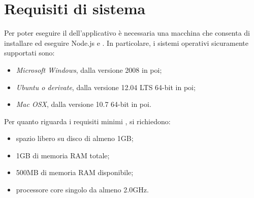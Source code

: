 \section{Requisiti di sistema}\label{requisiti}
Per poter eseguire il  dell'applicativo è necessaria una macchina che consenta di installare ed eseguire Node.js e . In particolare, i sistemi operativi sicuramente supportati sono:
\begin{itemize}
\item \textit{Microsoft Windows}, dalla versione 2008  in poi;
\item \textit{Ubuntu o derivate}, dalla versione 12.04 LTS 64-bit in poi;
\item \textit{Mac OSX}, dalla versione 10.7 64-bit in poi.
\end{itemize}
Per quanto riguarda i requisiti minimi , si richiedono:
\begin{itemize}
\item spazio libero su disco di almeno 1GB;
\item 1GB di memoria RAM totale;
\item 500MB di memoria RAM disponibile;
\item processore core singolo da almeno 2.0GHz.
\end{itemize}
